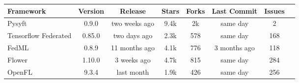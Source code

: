 \begin{changemargin}{0cm}{0cm}
    \centering
    \begin{tabular}{|m{2.4cm}||c|c|c|c|c|c|c|}
        \hline
            \textbf{Framework} & \textbf{Version} & \textbf{Release} & \textbf{Stars} & \textbf{Forks} & \textbf{Last Commit} & \textbf{Issues} \\
        \hline
            Pysyft \cite{fl_framework:pysyft} & 0.9.0 & two weeks ago & 9.4k & 2k & same day & 2
        \\
        \hline
            Tensorflow Federated \cite{fl_framework:tensorflow_federated} & 0.85.0 & two days ago & 2.3k & 578 & same day & 168
        \\
        \hline
            FedML \cite{fl_framework:fedml} & 0.8.9 & 11 months ago & 4.1k & 776 & 3 months ago & 118
        \\
        \hline
            Flower \cite{fl_framework:flower} & 1.10.0 & 3 weeks ago & 4.7k & 815 & same day & 284
        \\
        \hline
            OpenFL \cite{fl_framework:openfl} & 9.3.4 & last month & 1.9k & 426 & same day & 256
        \\
        \hline
    \end{tabular}
    \label{table:updated_fl_framework_comparison}
\end{changemargin}
